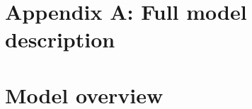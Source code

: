 \documentclass[11pt]{article}
\begin{document}
\newpage{}

\section*{Appendix A: Full model description}





\renewcommand{\theequation}{A\arabic{equation}}
\renewcommand{\thetable}{A\arabic{table}}
\setcounter{equation}{0}  %
\setcounter{figure}{0}
\setcounter{table}{0}

\section*{Model overview}
\end{document}
